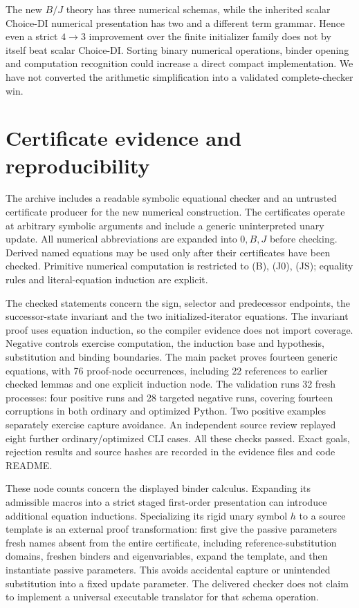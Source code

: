 \documentclass[11pt]{article}
\theoremstyle{definition}
\begin{document}
The new $B/J$ theory has three numerical schemas, while the inherited
scalar Choice-DI numerical presentation has two and a different term
grammar. Hence even a strict $4\to3$ improvement over the finite
initializer family does not by itself beat scalar Choice-DI. Sorting
binary numerical operations, binder opening and computation recognition
could increase a direct compact implementation. We have not converted
the arithmetic simplification into a validated complete-checker win.

\section{Certificate evidence and reproducibility}
\label{sec:evidence}

The archive includes a readable symbolic equational checker and an
untrusted certificate producer for the new numerical construction. The
certificates operate at arbitrary symbolic arguments and include a
generic uninterpreted unary update. All numerical abbreviations are
expanded into $0,B,J$ before checking. Derived named equations may be
used only after their certificates have been checked. Primitive numerical
computation is restricted to (B), (J0), (JS); equality rules and
literal-equation induction are explicit.

The checked statements concern the sign, selector and predecessor
endpoints, the successor-state invariant and the two initialized-iterator
equations. The invariant proof uses equation induction, so the compiler
evidence does not import coverage. Negative controls exercise computation,
the induction base and hypothesis, substitution and binding boundaries.
The main packet proves fourteen generic equations, with 76 proof-node
occurrences, including 22 references to earlier checked lemmas and one
explicit induction node. The validation runs 32 fresh processes: four
positive runs and 28 targeted negative runs, covering fourteen corruptions
in both ordinary and optimized Python. Two positive examples separately
exercise capture avoidance. An independent source review replayed eight
further ordinary/optimized CLI cases. All these checks passed. Exact goals,
rejection results and source hashes are recorded in the evidence files
and code README.

These node counts concern the displayed binder calculus. Expanding its
admissible macros into a strict staged first-order presentation can
introduce additional equation inductions. Specializing its rigid unary
symbol $h$ to a source template is an external proof transformation:
first give the passive parameters fresh names absent from the entire
certificate, including reference-substitution domains, freshen binders
and eigenvariables, expand the template, and then instantiate passive
parameters. This avoids accidental capture or unintended substitution
into a fixed update parameter. The delivered checker does not claim to
implement a universal executable translator for that schema operation.
\end{document}
